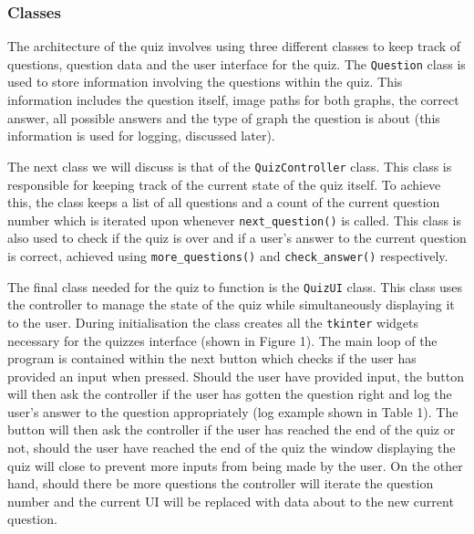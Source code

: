 \subsubsection*{Classes}
\begin{flushleft}
    \quad The architecture of the quiz involves using three different classes to keep track of questions, question data and the user interface for the quiz.
    The \verb|Question| class is used to store information involving the questions within the quiz. This information includes the question itself, image paths 
    for both graphs, the correct answer, all possible answers and the type of graph the question is about (this information is used for logging, discussed later).

    \quad The next class we will discuss is that of the \verb|QuizController| class. This class is responsible for keeping track of the current state of the quiz itself.
    To achieve this, the class keeps a list of all questions and a count of the current question number which is iterated upon whenever \verb|next_question()| is called. 
    This class is also used to check if the quiz is over and if a user's answer to the current question is correct, achieved using \verb|more_questions()| and \verb|check_answer()| respectively.

    \quad The final class needed for the quiz to function is the \verb|QuizUI| class. This class uses the controller to manage the state of the quiz while simultaneously displaying it to the user.
    During initialisation the class creates all the \verb|tkinter| widgets necessary for the quizzes interface (shown in Figure 1). The main loop of the program is contained within the 
    next button which checks if the user has provided an input when pressed. Should the user have provided input, the button will then ask the controller if the user has gotten the question right
    and log the user's answer to the question appropriately (log example shown in Table 1). The button will then ask the controller if the user has reached the end of the quiz or not, should the user
    have reached the end of the quiz the window displaying the quiz will close to prevent more inputs from being made by the user. On the other hand, should there be more questions the controller will iterate the question number
    and the current UI will be replaced with data about to the new current question.
\end{flushleft}
\pagebreak
